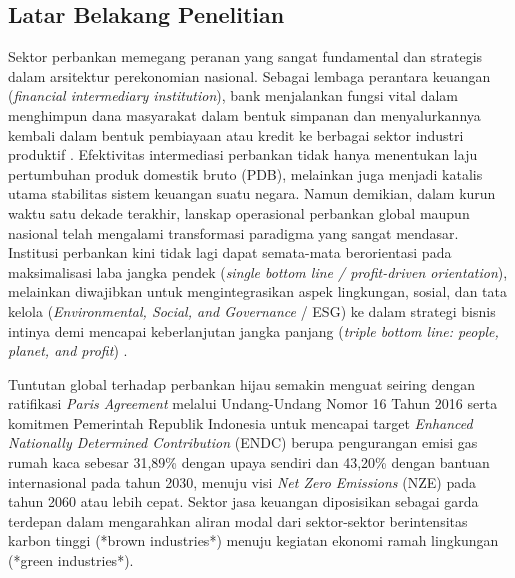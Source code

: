 \documentclass[12pt,a4paper]{article}
\numberwithin{equation}{section}
\begin{document}
\subsection{Latar Belakang Penelitian}

\noindent
Sektor perbankan memegang peranan yang sangat fundamental dan strategis dalam arsitektur perekonomian nasional. Sebagai lembaga perantara keuangan (\emph{financial intermediary institution}), bank menjalankan fungsi vital dalam menghimpun dana masyarakat dalam bentuk simpanan dan menyalurkannya kembali dalam bentuk pembiayaan atau kredit ke berbagai sektor industri produktif \citep{KuncoroSuhardjono2018, GurleyShaw1960}. Efektivitas intermediasi perbankan tidak hanya menentukan laju pertumbuhan produk domestik bruto (PDB), melainkan juga menjadi katalis utama stabilitas sistem keuangan suatu negara. Namun demikian, dalam kurun waktu satu dekade terakhir, lanskap operasional perbankan global maupun nasional telah mengalami transformasi paradigma yang sangat mendasar. Institusi perbankan kini tidak lagi dapat semata-mata berorientasi pada maksimalisasi laba jangka pendek (\emph{single bottom line / profit-driven orientation}), melainkan diwajibkan untuk mengintegrasikan aspek lingkungan, sosial, dan tata kelola (\emph{Environmental, Social, and Governance} / ESG) ke dalam strategi bisnis intinya demi mencapai keberlanjutan jangka panjang (\emph{triple bottom line: people, planet, and profit}) \citep{Freeman2010, Buallay2019}.

\noindent
Tuntutan global terhadap perbankan hijau semakin menguat seiring dengan ratifikasi \emph{Paris Agreement} melalui Undang-Undang Nomor 16 Tahun 2016 serta komitmen Pemerintah Republik Indonesia untuk mencapai target \emph{Enhanced Nationally Determined Contribution} (ENDC) berupa pengurangan emisi gas rumah kaca sebesar 31,89\% dengan upaya sendiri dan 43,20\% dengan bantuan internasional pada tahun 2030, menuju visi \emph{Net Zero Emissions} (NZE) pada tahun 2060 atau lebih cepat. Sektor jasa keuangan diposisikan sebagai garda terdepan dalam mengarahkan aliran modal dari sektor-sektor berintensitas karbon tinggi (*brown industries*) menuju kegiatan ekonomi ramah lingkungan (*green industries*).
\end{document}

